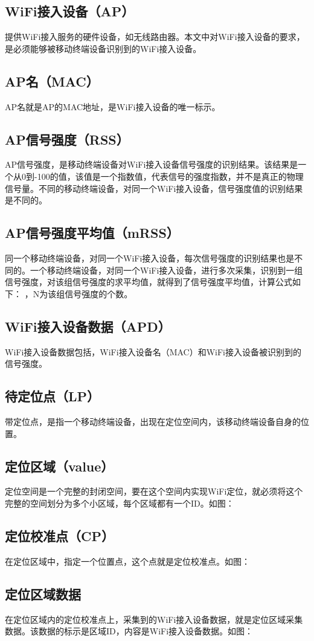 \documentclass[UTF8, twocolumn ]{ctexart}
\begin{document}
\subsection{WiFi接入设备（AP）}
提供WiFi接入服务的硬件设备，如无线路由器。本文中对WiFi接入设备的要求，是必须能够被移动终端设备识别到的WiFi接入设备。
\subsection{AP名（MAC）}
AP名就是AP的MAC地址，是WiFi接入设备的唯一标示。
\subsection{AP信号强度（RSS）}
AP信号强度，是移动终端设备对WiFi接入设备信号强度的识别结果。该结果是一个从0到-100的值，该值是一个指数值，代表信号的强度指数，并不是真正的物理信号量。不同的移动终端设备，对同一个WiFi接入设备，信号强度值的识别结果是不同的。
\subsection{AP信号强度平均值（mRSS）}
同一个移动终端设备，对同一个WiFi接入设备，每次信号强度的识别结果也是不同的。一个移动终端设备，对同一个WiFi接入设备，进行多次采集，识别到一组信号强度，对该组信号强度的求平均值，就得到了信号强度平均值，计算公式如下：
，N为该组信号强度的个数。
\subsection{WiFi接入设备数据（APD）}
WiFi接入设备数据包括，WiFi接入设备名（MAC）和WiFi接入设备被识别到的信号强度。
\subsection{待定位点（LP）}
带定位点，是指一个移动终端设备，出现在定位空间内，该移动终端设备自身的位置。
\subsection{定位区域（value）}
定位空间是一个完整的封闭空间，要在这个空间内实现WiFi定位，就必须将这个完整的空间划分为多个小区域，每个区域都有一个ID。如图：

\subsection{定位校准点（CP）}
在定位区域中，指定一个位置点，这个点就是定位校准点。如图：

\subsection{定位区域数据}
在定位区域内的定位校准点上，采集到的WiFi接入设备数据，就是定位区域采集数据。该数据的标示是区域ID，内容是WiFi接入设备数据。如图：
\end{document}

